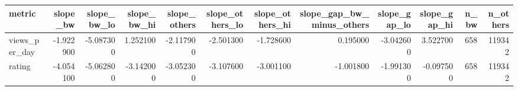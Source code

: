 \begin{tabular}{lrrrrrrrrrrr}
\toprule
metric & slope_bw & slope_bw_lo & slope_bw_hi & slope_others & slope_others_lo & slope_others_hi & slope_gap_bw_minus_others & slope_gap_lo & slope_gap_hi & n_bw & n_others \\
\midrule
views_per_day & -1.922900 & -5.087300 & 1.252100 & -2.117900 & -2.501300 & -1.728600 & 0.195000 & -3.042600 & 3.522700 & 658 & 119342 \\
rating & -4.054100 & -5.062800 & -3.142000 & -3.052300 & -3.107600 & -3.001100 & -1.001800 & -1.991300 & -0.097500 & 658 & 119342 \\
\bottomrule
\end{tabular}
